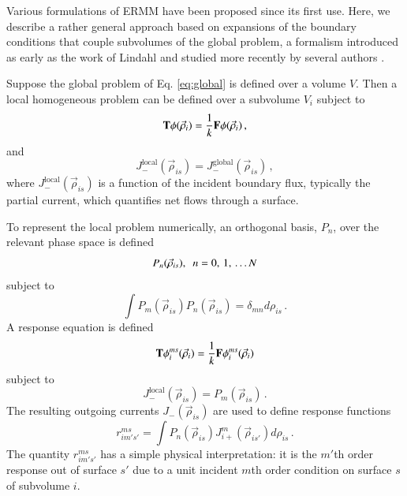 Various formulations of ERMM have been proposed since
its first use.  Here, we describe 
a rather general approach based on expansions of the boundary 
conditions that couple
subvolumes of the global problem, a formalism introduced 
as early as the work of Lindahl \cite{lindahl1976mdr} and
studied more recently by several authors
\cite{mosher2006ifr, roberts2011ser, roberts2012ksi}.

Suppose the global problem 
of Eq. \ref{eq:global} is defined over a 
volume $V$.  Then a local homogeneous problem can be defined over a 
subvolume $V_i$ subject to 
\begin{equation}
  \mathbf{T} \phi(\vec{\rho}_i) = 
    \frac{1}{k} \mathbf{F} \phi(\vec{\rho}_i) \, ,
  \label{eq:local}
\end{equation}
and
\begin{equation}
  J^{\mathrm{local}}_{-} (\vec{\rho}_{is}) = 
    J^{\mathrm{global}}_{-}(\vec{\rho}_{is}) \, ,
  \label{eq:localbc}
\end{equation}   
where $J^{\mathrm{local}}_{-} (\vec{\rho}_{is}) $ is a 
function of the incident boundary flux, typically the 
partial current, which quantifies net flows through a 
surface.

To represent the local problem numerically, an orthogonal basis, $P_n$,
over the relevant phase space is defined
\begin{equation}
  P_n(\vec{\rho}_{is}), \,\,\, n = 0, \, 1, \, \ldots N  \\
\end{equation}
subject to
\begin{equation}
   \int P_m(\vec{\rho}_{is}) P_n(\vec{\rho}_{is}) 
     = \delta_{mn} d\rho_{is} \, .
\end{equation}
A response equation is defined 
\begin{equation}
 \mathbf{T} \phi_{i}^{ms} (\vec{\rho}_i) = 
   \frac{1}{k} \mathbf{F} \phi_{i}^{ms} (\vec{\rho}_i) 
\end{equation}
subject to
\begin{equation}
 J^{\mathrm{local}}_{-} (\vec{\rho}_{is}) = P_m(\vec{\rho}_{is}) \, .
\end{equation}
The resulting outgoing currents $J_{-} (\vec{\rho}_{is}) $ are used to define
response functions
\begin{equation}
       r^{ms}_{im's'} = \int  P_n(\vec{\rho}_{is})  
        J_{i+}^{m} (\vec{\rho}_{is'}) d\rho_{is} \, .
\label{eq:responsefunction}
\end{equation}
The quantity $r^{ms}_{im's'}$ has a simple physical
interpretation: it is the $m'$th order response 
out of surface $s'$ due to a unit incident $m$th order condition on 
surface $s$ of subvolume $i$. 

